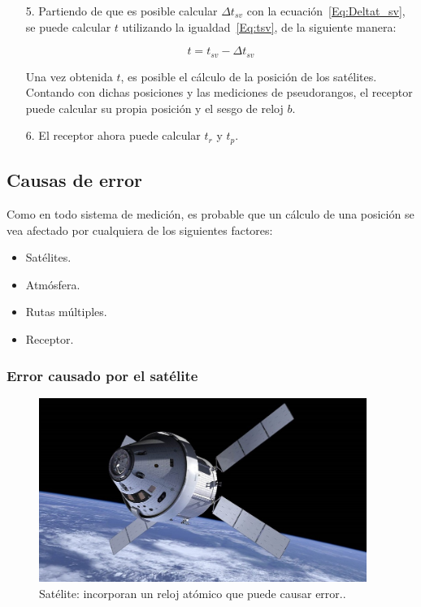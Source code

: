 {\begin{itemize}
y $\Delta n$ es una constante dada por la observación.\\

\item[5.] Partiendo de que es posible calcular $\Delta t_{sv}$ con la ecuación~\ref{Eq:Deltat_sv}, se puede calcular $t$ utilizando la igualdad~\ref{Eq:tsv}, de la siguiente manera:

\begin{equation}
\label{t}
t = t_{sv} - \Delta t_{sv}
\end{equation}

Una vez obtenida $t$, es posible el cálculo de la posición de los satélites. Contando con dichas posiciones y las mediciones de pseudorangos, el receptor puede calcular su propia posición y el sesgo de reloj $b$.

\item[6.] El receptor ahora puede calcular $t_r$ y $t_p$.
\end{itemize}
}
\subsection{Causas de error}\label{subsec:CauErr}

Como en todo sistema de medición, es probable que un cálculo de una posición se vea afectado por cualquiera de los siguientes factores: 

\begin{itemize}
	\item Satélites.
	\item Atmósfera.
	\item Rutas múltiples.
	\item Receptor.
\end{itemize} 

\subsubsection{Error causado por el satélite}

\begin{figure}[H]
\centering
\includegraphics[width=0.95\textwidth]{Figures/Sat}
\caption[Satélite: incorporan un reloj atómico que puede causar error.]{Satélite: incorporan un reloj atómico que puede causar error.\footnotemark.}
\label{fig:ErrSat}
\end{figure}

